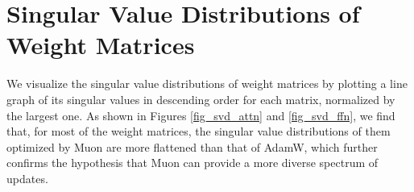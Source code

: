 \section{Singular Value Distributions of Weight Matrices}
\label{sec:appendix:svd}
We visualize the singular value distributions of weight matrices by plotting a line graph of its singular values in descending order for each matrix, normalized by the largest one. As shown in Figures \ref{fig_svd_attn} and \ref{fig_svd_ffn}, we find that, for most of the weight matrices, the singular value distributions of them optimized by Muon are more flattened than that of AdamW, which further confirms the hypothesis that Muon can provide a more diverse spectrum of updates.





